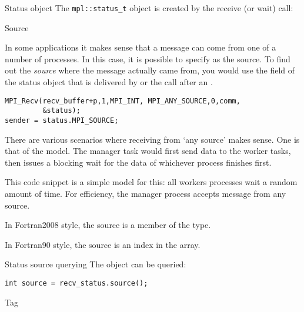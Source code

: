 \begin{mplnote}{Status object}
  The \lstinline+mpl::status_t+ object is created by the receive
  (or wait) call:
\end{mplnote}

 {Source}
\label{sec:mpi-source}

In some applications it makes sense that a message can come from 
one of a number of processes. In this case, it is possible to specify
 as the source.
%
To find out the \emph{source}
where the message actually came from,
you would use the  field of the status object
that is delivered by 
or the  call after an .
\begin{lstlisting}
MPI_Recv(recv_buffer+p,1,MPI_INT, MPI_ANY_SOURCE,0,comm,
         &status);
sender = status.MPI_SOURCE;
\end{lstlisting}

There are various scenarios where receiving from `any source' makes sense.
One is that of the  model. The manager task would first send
data to the worker tasks, then issues a blocking wait for the data of whichever process
finishes first.

This code snippet is a simple model for this: all workers processes wait
a random amount of time. For efficiency, the manager process accepts message from any source.


In Fortran2008 style, the source is a member of the  type.


In Fortran90 style, the source is an index in the  array.


\begin{mplnote}{Status source querying}
The  object can be queried:
\begin{lstlisting}
int source = recv_status.source();
\end{lstlisting}
\end{mplnote}

 {Tag}
\label{sec:mpi-tag}

